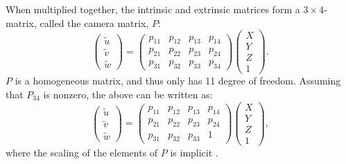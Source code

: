 When multiplied together, the intrinsic and extrinsic matrices form a $3\times4$-matrix, called the camera matrix, $P$:
\begin{equation} \label{eq:projection2}
\begin{pmatrix} \tilde{u} \\ \tilde{v} \\ \tilde{w} \end{pmatrix} =
\begin{pmatrix} p_{11} & p_{12} & p_{13} & p_{14} \\
 				p_{21} & p_{22} & p_{23} & p_{24} \\
				p_{31} & p_{32} & p_{33} & p_{34} \end{pmatrix}
\begin{pmatrix}X \\Y \\Z \\1\end{pmatrix}.
\end{equation}
$P$ is a homogeneous matrix, and thus only has 11 degree of freedom.
Assuming that $P_{34}$ is nonzero, the above can be written as:
\begin{equation}\label{eq:projection3}
\begin{pmatrix} \tilde{u} \\ \tilde{v} \\ \tilde{w} \end{pmatrix} =
\begin{pmatrix} p_{11} & p_{12} & p_{13} & p_{14} \\
 				p_{21} & p_{22} & p_{23} & p_{24} \\
				p_{31} & p_{32} & p_{33} & 1 \end{pmatrix}
\begin{pmatrix}X \\Y \\Z \\1\end{pmatrix},
\end{equation}
where the scaling of the elements of $P$ is implicit \cite[p. 153-165]{hartley-zisserman}.

